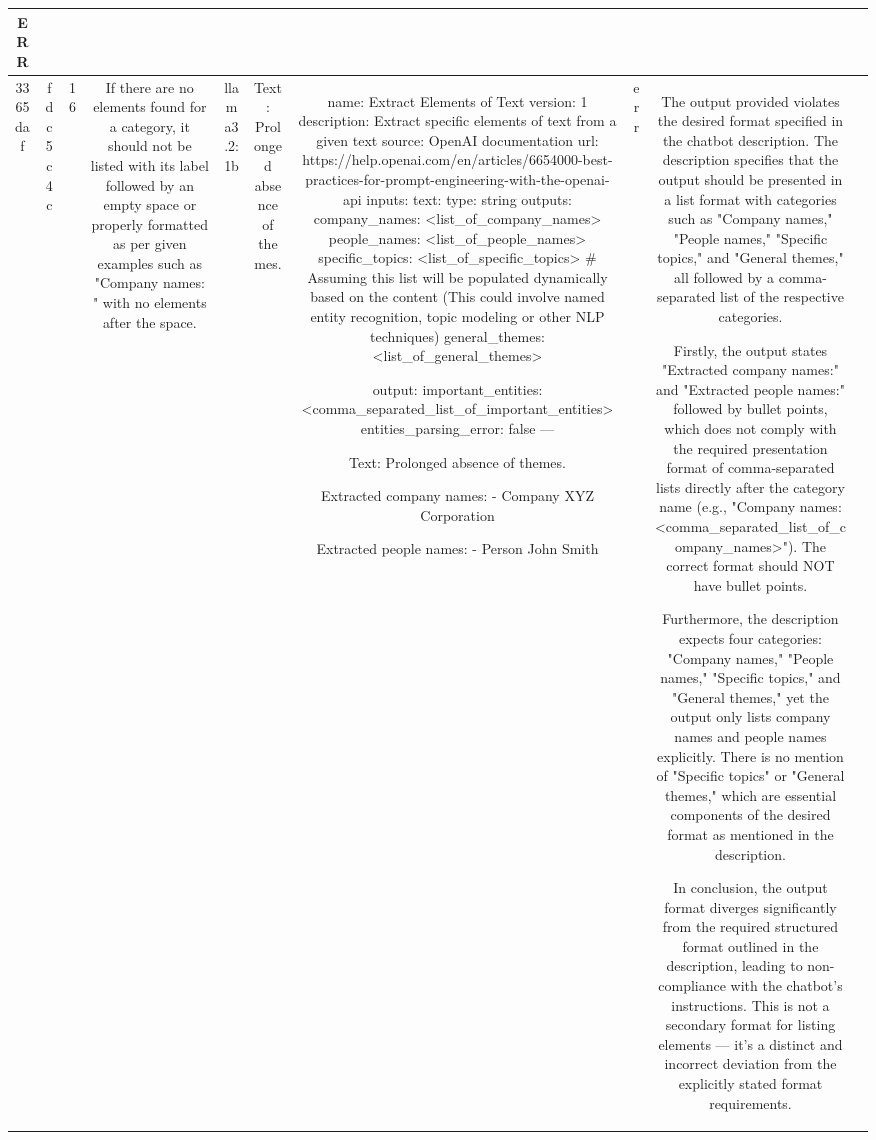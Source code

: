 \begin{table}[h!]
\begin{tabular}{|c|c|c|c|c|c|c|c|c|c|}
ERR & \\
\hline
3365daf & fdc5c4c & 16 & If there are no elements found for a category, it should not be listed with its label followed by an empty space or properly formatted as per given examples such as "Company names: " with no elements after the space. & llama3.2:1b & Text: Prolonged absence of themes. & name: Extract Elements of Text
version: 1
description: Extract specific elements of text from a given text
source: OpenAI documentation
url: https://help.openai.com/en/articles/6654000-best-practices-for-prompt-engineering-with-the-openai-api
inputs:
  text:
    type: string
outputs:
  company_names: <list_of_company_names>
  people_names: <list_of_people_names>
  specific_topics: <list_of_specific_topics> # Assuming this list will be populated dynamically based on the content (This could involve named entity recognition, topic modeling or other NLP techniques)
  general_themes: <list_of_general_themes>

output:
  important_entities: <comma_separated_list_of_important_entities>
  entities_parsing_error: false
---

Text: Prolonged absence of themes.

Extracted company names: 
- Company XYZ Corporation

Extracted people names: 
- Person John Smith & err & The output provided violates the desired format specified in the chatbot description. The description specifies that the output should be presented in a list format with categories such as "Company names," "People names," "Specific topics," and "General themes," all followed by a comma-separated list of the respective categories.

Firstly, the output states "Extracted company names:" and "Extracted people names:" followed by bullet points, which does not comply with the required presentation format of comma-separated lists directly after the category name (e.g., "Company names: <comma_separated_list_of_company_names>"). The correct format should NOT have bullet points.

Furthermore, the description expects four categories: "Company names," "People names," "Specific topics," and "General themes," yet the output only lists company names and people names explicitly. There is no mention of "Specific topics" or "General themes," which are essential components of the desired format as mentioned in the description.

In conclusion, the output format diverges significantly from the required structured format outlined in the description, leading to non-compliance with the chatbot's instructions. This is not a secondary format for listing elements — it's a distinct and incorrect deviation from the explicitly stated format requirements.


\end{tabular}
\end{table}
